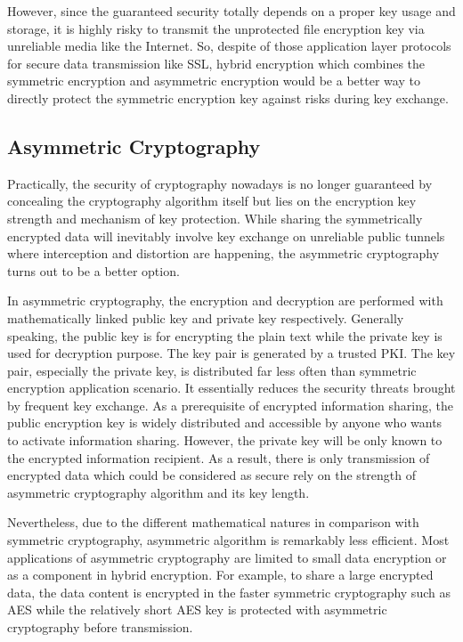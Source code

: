 However, since the guaranteed security totally depends on a proper key usage and storage, it is highly risky to transmit the unprotected file encryption key via unreliable media like the Internet. So, despite of those application layer protocols for secure data transmission like SSL, hybrid encryption which combines the symmetric encryption and asymmetric encryption would be a better way to directly protect the symmetric encryption key against risks during key exchange.

\subsection{Asymmetric Cryptography}

Practically, the security of cryptography nowadays is no longer guaranteed by concealing the cryptography algorithm itself but lies on the encryption key strength and mechanism of key protection. While sharing the symmetrically encrypted data will inevitably involve key exchange on unreliable public tunnels where interception and distortion are happening, the asymmetric cryptography turns out to be a better option.

In asymmetric cryptography, the encryption and decryption are performed with mathematically linked public key and private key respectively. Generally speaking, the public key is for encrypting the plain text while the private key is used for decryption purpose. The key pair is generated by a trusted PKI. The key pair, especially the private key, is distributed far less often than symmetric encryption application scenario. It essentially reduces the security threats brought by frequent key exchange. As a prerequisite of encrypted information sharing, the public encryption key is widely distributed and accessible by anyone who wants to activate information sharing. However, the private key will be only known to the encrypted information recipient. As a result, there is only transmission of encrypted data which could be considered as secure rely on the strength of asymmetric cryptography algorithm and its key length.

Nevertheless, due to the different mathematical natures in comparison with symmetric cryptography, asymmetric algorithm is remarkably less efficient. Most applications of asymmetric cryptography are limited to small data encryption or as a component in hybrid encryption. For example, to share a large encrypted data, the data content is encrypted in the faster symmetric cryptography such as AES while the relatively short AES key is protected with asymmetric cryptography before transmission.

